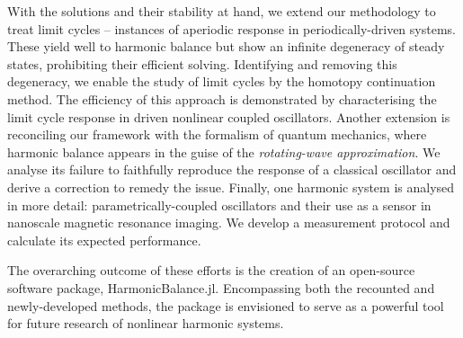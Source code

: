With the solutions and their stability at hand, we extend our methodology to treat limit cycles – instances of aperiodic response in periodically-driven systems. These yield well to harmonic balance but show an infinite degeneracy of steady states, prohibiting their efficient solving. Identifying and removing this degeneracy, we enable the study of limit cycles by the homotopy continuation method. The efficiency of this approach is demonstrated by characterising the limit cycle response in driven nonlinear coupled oscillators. Another extension is reconciling our framework with the formalism of quantum mechanics, where harmonic balance appears in the guise of the \textit{rotating-wave approximation}. We analyse its failure to faithfully reproduce the response of a classical oscillator and derive a correction to remedy the issue. Finally, one harmonic system is analysed in more detail: parametrically-coupled oscillators and their use as a sensor in nanoscale magnetic resonance imaging. We develop a measurement protocol and calculate its expected performance.

The overarching outcome of these efforts is the creation of an open-source software package, HarmonicBalance.jl. Encompassing both the recounted and newly-developed methods, the package is envisioned to serve as a powerful tool for future research of nonlinear harmonic systems. 

 

 
